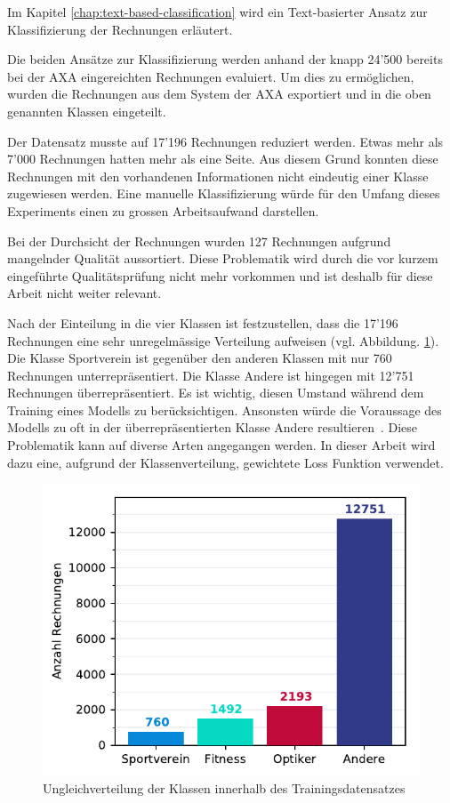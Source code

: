Im Kapitel \ref{chap:text-based-classification} wird ein Text-basierter Ansatz zur Klassifizierung der Rechnungen erläutert.

Die beiden Ansätze zur Klassifizierung werden anhand der knapp 24'500 bereits bei der AXA eingereichten Rechnungen evaluiert. Um dies zu ermöglichen, wurden die Rechnungen aus dem System der AXA exportiert und in die oben genannten Klassen eingeteilt. 

Der Datensatz musste auf 17'196 Rechnungen reduziert werden. Etwas mehr als 7'000 Rechnungen hatten mehr als eine Seite. Aus diesem Grund konnten diese Rechnungen mit den vorhandenen Informationen nicht eindeutig einer Klasse zugewiesen werden. Eine manuelle Klassifizierung würde für den Umfang dieses Experiments einen zu grossen Arbeitsaufwand darstellen.

Bei der Durchsicht der Rechnungen wurden 127 Rechnungen aufgrund mangelnder Qualität aussortiert. Diese Problematik wird durch die vor kurzem eingeführte Qualitätsprüfung nicht mehr vorkommen und ist deshalb für diese Arbeit nicht weiter relevant.

Nach der Einteilung in die vier Klassen ist festzustellen, dass die 17'196 Rechnungen eine sehr unregelmässige Verteilung aufweisen (vgl. Abbildung. \ref{class-distribution}). Die Klasse Sportverein ist gegenüber den anderen Klassen mit nur 760 Rechnungen unterrepräsentiert. Die Klasse Andere ist hingegen mit 12'751 Rechnungen überrepräsentiert. Es ist wichtig, diesen Umstand während dem Training eines Modells zu berücksichtigen. Ansonsten würde die Voraussage des Modells zu oft in der überrepräsentierten Klasse Andere resultieren~\autocite{Buda2018}. Diese Problematik kann auf diverse Arten angegangen werden. In dieser Arbeit wird dazu eine, aufgrund der Klassenverteilung, gewichtete Loss Funktion verwendet.

\begin{figure}[h]
    \captionsetup{width=.9\linewidth}
    \caption{Ungleichverteilung der Klassen innerhalb des Trainingsdatensatzes}
    \label{class-distribution}
    \centering
    \includegraphics[scale=1]{graphics/matplot/class-weight.pdf}
\end{figure}
